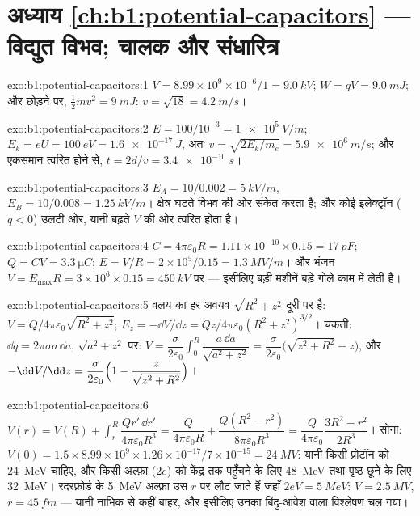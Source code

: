 \section*{अध्याय \ref{ch:b1:potential-capacitors} --- विद्युत विभव; चालक और संधारित्र}

\begin{solution}{exo:b1:potential-capacitors:1}
$V = 8.99 \times 10^9 \times 10^{-6}/1 = \qty{9.0}{kV}$; $W = qV = \qty{9.0}{mJ}$;
और छोड़ने पर, $\tfrac12mv^2 = \qty{9}{mJ}$: $v = \sqrt{18} = \qty{4.2}{m/s}$।
\end{solution}

\begin{solution}{exo:b1:potential-capacitors:2}
$E = 100/10^{-3} = \qty{1e5}{V/m}$; $E_k = eU = \qty{100}{eV} = \qty{1.6e-17}{J}$,
अतः $v = \sqrt{2E_k/m_e} = \qty{5.9e6}{m/s}$; और एकसमान त्वरित होने से,
$t = 2d/v = \qty{3.4e-10}{s}$।
\end{solution}

\begin{solution}{exo:b1:potential-capacitors:3}
$E_A = 10/0.002 = \qty{5}{kV/m}$, $E_B = 10/0.008 = \qty{1.25}{kV/m}$। क्षेत्र
घटते विभव की ओर संकेत करता है; और कोई इलेक्ट्रॉन ($q < 0$) उलटी ओर, यानी
बढ़ते $V$ की ओर त्वरित होता है।
\end{solution}

\begin{solution}{exo:b1:potential-capacitors:4}
$C = 4\pi\varepsilon_0R = 1.11 \times 10^{-10} \times 0.15 = \qty{17}{pF}$; $Q = CV =
\qty{3.3}{\micro C}$; $E = V/R = 2 \times 10^5/0.15 = \qty{1.3}{MV/m}$। और भंजन
$V = E_{\max}R = 3 \times 10^6 \times 0.15 = \qty{450}{kV}$ पर --- इसीलिए बड़ी
मशीनें बड़े गोले काम में लेती हैं।
\end{solution}

\begin{solution}{exo:b1:potential-capacitors:5}
वलय का हर अवयव $\sqrt{R^2 + z^2}$ दूरी पर है: $V =
Q/4\pi\varepsilon_0\sqrt{R^2 + z^2}$; $E_z = -\dd V/\dd z = Qz/4\pi\varepsilon_0(R^2 +
z^2)^{3/2}$। चकती: $\dd q = 2\pi\sigma a\,\dd a$, $\sqrt{a^2 + z^2}$ पर: $V =
\dfrac{\sigma}{2\varepsilon_0}\displaystyle\int_0^R\dfrac{a\,\dd a}{\sqrt{a^2 + z^2}} =
\dfrac{\sigma}{2\varepsilon_0}\bigl(\sqrt{z^2 + R^2} - z\bigr)$, और $-\dd V/\dd z =
\dfrac{\sigma}{2\varepsilon_0}\Bigl(1 - \dfrac{z}{\sqrt{z^2 + R^2}}\Bigr)$।
\end{solution}

\begin{solution}{exo:b1:potential-capacitors:6}
$V(r) = V(R) + \displaystyle\int_r^R\dfrac{Qr'\,\dd r'}{4\pi\varepsilon_0R^3} =
\dfrac{Q}{4\pi\varepsilon_0R} + \dfrac{Q(R^2 - r^2)}{8\pi\varepsilon_0R^3} = \dfrac{Q}{4\pi\varepsilon_0}
\dfrac{3R^2 - r^2}{2R^3}$। सोना: $V(0) = 1.5 \times 8.99 \times 10^9 \times 1.26 \times
10^{-17}/7 \times 10^{-15} = \qty{24}{MV}$: यानी किसी प्रोटॉन को \qty{24}{MeV}
चाहिए, और किसी अल्फ़ा ($2e$) को केंद्र तक पहुँचने के लिए \qty{48}{MeV} तथा
पृष्ठ छूने के लिए \qty{32}{MeV}। रदरफ़ोर्ड के \qty{5}{MeV} अल्फ़ा उस
$r$ पर लौट जाते हैं जहाँ $2eV =
\qty{5}{MeV}$: $V = \qty{2.5}{MV}$, $r = \qty{45}{fm}$ --- यानी नाभिक से
कहीं बाहर, और इसीलिए उनका बिंदु-आवेश वाला विश्लेषण चल गया।
\end{solution}

